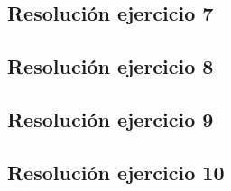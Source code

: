 \documentclass[11pt,a4paper]{article}
\begin{document}
	\subsection{Resolución ejercicio 7}\label{ejercicio_7}
		

	\newpage

	\subsection{Resolución ejercicio 8}\label{ejercicio_8}
		

	\newpage

	\subsection{Resolución ejercicio 9}\label{ejercicio_9}
		

	\newpage

	\subsection{Resolución ejercicio 10}\label{ejercicio_10}
		
\end{document}
